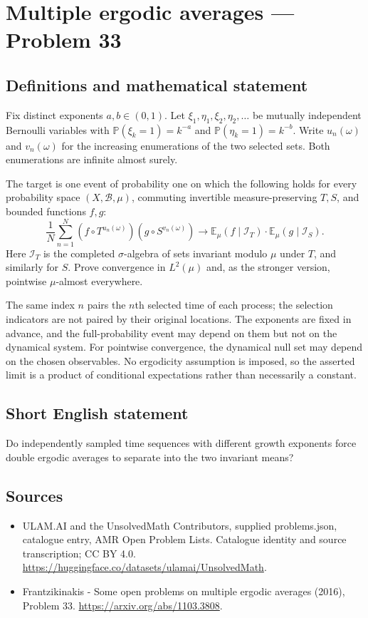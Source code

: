 \documentclass[11pt,a4paper]{article}
\begin{document}
\section*{Multiple ergodic averages — Problem 33}\label{statement}

\subsection{Definitions and mathematical statement}
Fix distinct exponents $a,b\in(0,1)$. Let
$\xi_1,\eta_1,\xi_2,\eta_2,\ldots$ be mutually
independent Bernoulli variables with
$\mathbb P(\xi_k=1)=k^{-a}$ and
$\mathbb P(\eta_k=1)=k^{-b}$.
Write $u_n(\omega)$ and $v_n(\omega)$ for
the increasing enumerations of the two selected
sets. Both enumerations are infinite almost surely.

The target is one event of probability one
on which the following holds for every
probability space $(X,\mathcal B,\mu)$, commuting
invertible measure-preserving $T,S$, and bounded
functions $f,g$:
\[
 \frac1N\sum_{n=1}^N
       (f\circ T^{u_n(\omega)})(g\circ S^{v_n(\omega)})
       \longrightarrow
       \mathbb E_\mu(f\mid\mathcal I_T)\cdot
       \mathbb E_\mu(g\mid\mathcal I_S).
\]
Here $\mathcal I_T$ is the completed
$\sigma$-algebra of sets invariant modulo $\mu$
under $T$, and similarly for $S$.
Prove convergence in $L^2(\mu)$ and, as
the stronger version, pointwise $\mu$-almost
everywhere.

The same index $n$ pairs the $n$th selected
time of each process; the selection indicators
are not paired by their original locations.
The exponents are fixed in advance, and
the full-probability event may depend on
them but not on the dynamical system.
For pointwise convergence, the dynamical null
set may depend on the chosen observables.
No ergodicity assumption is imposed, so
the asserted limit is a product of conditional
expectations rather than necessarily a constant.
\subsection{Short English statement}
Do independently sampled time sequences with different growth exponents force double ergodic averages to separate into the two invariant means?
\subsection{Sources}
\begin{itemize}
\item[S1] ULAM.AI and the UnsolvedMath Contributors, supplied problems.json, catalogue entry, AMR Open Problem Lists. Catalogue identity and source transcription; CC BY 4.0.
\url{https://huggingface.co/datasets/ulamai/UnsolvedMath}.
\item[S2] Frantzikinakis - Some open problems on multiple ergodic averages (2016), Problem 33. 
\url{https://arxiv.org/abs/1103.3808}.
\end{itemize}
\end{document}
